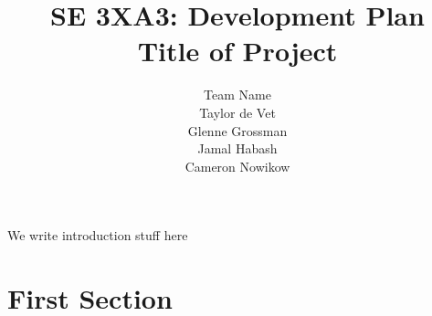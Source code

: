 \documentclass{article}
\title{SE 3XA3: Development Plan\\Title of Project}
\author{Team Name
		\\ Taylor de Vet
    \\ Glenne Grossman
		\\ Jamal Habash
		\\ Cameron Nowikow
}
\date{}
\begin{document}
\newpage

\maketitle

We write introduction stuff here

\section{First Section}
\end{document}
